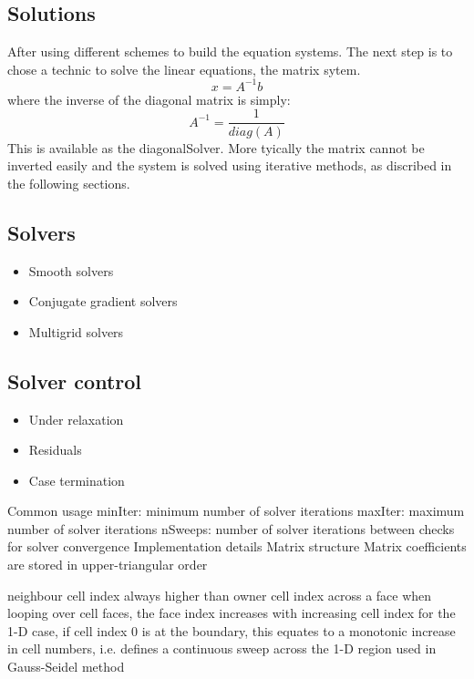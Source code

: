 \documentclass{article}
\begin{document}
\subsection{Solutions}

After using different schemes to build the equation systems. The next step is to chose a technic to solve the linear equations, the matrix sytem. 
\begin{equation}
x = A^{-1}b
\end{equation}
where the inverse of the diagonal matrix is simply:
\begin{equation}
A^{-1} = \frac{1}{diag(A)}
\end{equation}
This is available as the diagonalSolver. More tyically the matrix cannot be inverted easily and the system is solved using iterative methods, as discribed in the following sections. 

\subsection{Solvers}

\begin{itemize}
\item Smooth solvers
\item Conjugate gradient solvers
\item Multigrid solvers
\end{itemize}

\subsection{Solver control}
\begin{itemize}
\item Under relaxation
\item Residuals
\item Case termination
\end{itemize}

Common usage
minIter: minimum number of solver iterations
maxIter: maximum number of solver iterations
nSweeps: number of solver iterations between checks for solver convergence
Implementation details
Matrix structure
Matrix coefficients are stored in upper-triangular order

neighbour cell index always higher than owner cell index across a face
when looping over cell faces, the face index increases with increasing cell index
for the 1-D case, if cell index 0 is at the boundary, this equates to a monotonic increase in cell numbers, i.e. defines a continuous sweep across the 1-D region
used in Gauss-Seidel method
\end{document}
